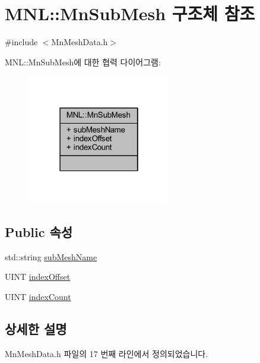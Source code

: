 \hypertarget{struct_m_n_l_1_1_mn_sub_mesh}{}\section{M\+NL\+:\+:Mn\+Sub\+Mesh 구조체 참조}
\label{struct_m_n_l_1_1_mn_sub_mesh}


{\ttfamily \#include $<$Mn\+Mesh\+Data.\+h$>$}



M\+NL\+:\+:Mn\+Sub\+Mesh에 대한 협력 다이어그램\+:\nopagebreak
\begin{figure}[H]
\begin{center}
\leavevmode
\includegraphics[width=178pt]{struct_m_n_l_1_1_mn_sub_mesh__coll__graph}
\end{center}
\end{figure}
\subsection*{Public 속성}
\begin{DoxyCompactItemize}
\item 
std\+::string \hyperlink{struct_m_n_l_1_1_mn_sub_mesh_a713e854038eb6a1716bf0be8caf06ee3}{sub\+Mesh\+Name}
\item 
U\+I\+NT \hyperlink{struct_m_n_l_1_1_mn_sub_mesh_aeba5d9a30e2473f7ddb99ea74458c5a4}{index\+Offset}
\item 
U\+I\+NT \hyperlink{struct_m_n_l_1_1_mn_sub_mesh_a07266903cf29dede5fd614ef6eb36d14}{index\+Count}
\end{DoxyCompactItemize}


\subsection{상세한 설명}


Mn\+Mesh\+Data.\+h 파일의 17 번째 라인에서 정의되었습니다.



